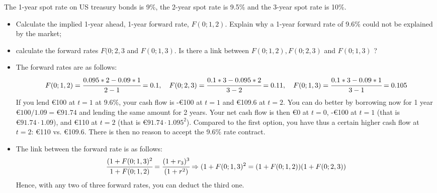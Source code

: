 \documentclass[12pt,a4paper]{exam}
\begin{document}
\begin{questions}

\question The 1-year spot rate on US treasury bonds is 9\%, the 2-year spot rate is 9.5\% and the 3-year spot rate is 10\%. 
\begin{itemize}
\item Calculate the implied 1-year ahead, 1-year forward rate, $F(0;1,2)$. Explain why a 1-year forward rate of 9.6\% could not be explained by the market;
\item calculate the forward rates  $F(0; 2, 3$ and $F(0; 1,3)$. Is there a link between $F(0;1,2),F(0;2,3)$ and $F(0;1,3)$ ?
\end{itemize}
\begin{solution}
\begin{itemize}
\item The forward rates are as follows:
\begin{equation}
F(0;1,2)= \cfrac{0.095*2 - 0.09*1}{2-1} = 0.1, \quad F(0;2,3)= \cfrac{0.1*3 - 0.095*2}{3-2} = 0.11, \quad F(0;1,3)= \cfrac{0.1*3 - 0.09*1}{3-1} = 0.105
\end{equation}
If you lend €100 at $t=1$ at 9.6\%, your cash flow is -€100 at $t=1$ and €109.6 at $t=2$. You can do better by borrowing now for 1 year $€100/1.09=€91.74$ and lending the same amount for 2 years. Your net cash flow is then €0 at $t=0$, -€100 at $t=1$ (that is $€91.74\cdot 1.09$), and €110 at $t=2$ (that is $€91.74\cdot 1.095^2$). Compared to the first option, you have thus a certain higher cash flow at $t=2$: €110 vs. €109.6.  There is then no reason to accept the 9.6\% rate contract. 
\item The link between the forward rate is as follows:
\begin{equation}
\cfrac{(1+F(0;1,3)^2}{1+F(0;1,2)} = \cfrac{(1+r_3)^3}{(1+r^2)} \Rightarrow (1+F(0;1,3)^2 = (1+F(0;1,2))(1+F(0;2,3))
\end{equation}
Hence, with any two of three forward rates, you can deduct the third one.
\end{itemize}
\end{solution}


\end{questions}
\end{document}

